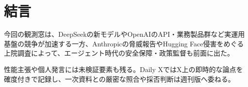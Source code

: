 \section{結言}
今回の観測窓は、DeepSeekの新モデルやOpenAIのAPI・業務製品群など実運用基盤の競争が加速する一方、Anthropicの脅威報告やHugging Face侵害をめぐる上院調査によって、エージェント時代の安全保障・政策監督も前面に出た。

性能主張や個人発言には未検証要素も残る。Daily XではX上の即時的な論点を確度付きで記録し、一次資料との厳密な照合や採否判断は週刊版へ委ねる。
